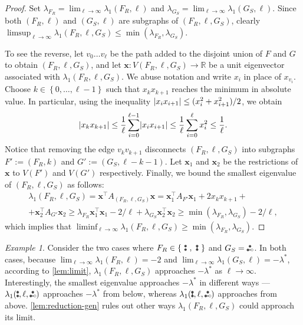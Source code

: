 \documentclass[11pt]{article}
\theoremstyle{definition}
\theoremstyle{remark}
\newtheorem*{example}{Example}
\DeclarePairedDelimiter\abs{\lvert}{\rvert}
\newcommand{\sset}[1]{\left\{{#1}\right\}}
\newcommand{\la}{\lambda}
\newcommand{\las}{\lambda^*}
\newcommand{\R}{\mathbb{R}}
\newcommand{\bx}{\bm{x}}
\newcommand{\T}{\intercal}
\newcommand{\etwo}{\tikz[baseline=-0.2ex, scale=0.9]{\draw[darkgray, thick] (0,0)--(0.2,0); \draw[darkgray, fill=darkgray] (0,0) circle (0.05); \draw[darkgray, fill=darkgray] (0.1,0.17320508075) circle (0.05); \draw[darkgray, fill=white] (0.2,0) circle (0.05);}}
\newcommand{\ktwo}{\tikz[baseline=-0.2ex, scale=0.9]{\draw[darkgray, thick] (0,0)--(0,0.17320508075); \draw[darkgray, fill=darkgray] (0,0) circle (0.05); \draw[darkgray, fill=darkgray] (0,0.17320508075) circle (0.05);}}
\newcommand{\ktwoc}{\tikz[baseline=-0.2ex, scale=0.9]{\draw[darkgray, fill=darkgray] (0,0) circle (0.05); \draw[darkgray, fill=darkgray] (0,0.17320508075) circle (0.05);}}
\begin{document}
\begin{proof}
    Set $\la_{F_R} = \lim_{\ell\to\infty} \la_1(F_R, \ell)$ and $\la_{G_S} = \lim_{\ell\to\infty} \la_1(G_S, \ell)$. Since both $(F_R, \ell)$ and $(G_S, \ell)$ are subgraphs of $(F_R, \ell, G_S)$, clearly $\limsup_{\ell \to\infty}\la_1(F_R, \ell, G_S) \le \min(\la_{F_R},\la_{G_S})$.
    
    To see the reverse, let $v_0\dots v_\ell$ be the path added to the disjoint union of $F$ and $G$ to obtain $(F_R, \ell, G_S)$, and let $\bx \colon V(F_R, \ell, G_S) \to \R$ be a unit eigenvector associated with $\la_1(F_R, \ell, G_S)$. We abuse notation and write $x_i$ in place of $x_{v_i}$. Choose $k \in \sset{0,\dots,\ell-1}$ such that $x_kx_{k+1}$ reaches the minimum in absolute value. In particular, using the inequality $\abs{x_ix_{i+1}} \le (x_i^2+x_{i+1}^2)/2$, we obtain
    \[
        \abs{x_kx_{k+1}} \le \frac{1}{\ell} \sum_{i=0}^{\ell-1}\abs{x_ix_{i+1}} \le \frac{1}{\ell}\sum_{i=0}^{\ell}x_i^2 \le \frac{1}{\ell}.
    \]
    Notice that removing the edge $v_kv_{k+1}$ disconnects $(F_R, \ell, G_S)$ into subgraphs $F' := (F_R, k)$ and $G' := (G_S, \ell-k-1)$. Let $\bx_1$ and $\bx_2$ be the restrictions of $\bx$ to $V(F')$ and $V(G')$ respectively. Finally, we bound the smallest eigenvalue of $(F_R, \ell, G_S)$ as follows:
    \begin{multline*}
        \la_1(F_R, \ell, G_S) = \bx^\T A_{(F_R, \ell, G_S)} \bx 
        = \bx_1^\T A_{F'} \bx_1 + 2x_kx_{k+1} + \\ + \bx_2^\T A_{G'}\bx_2
        \ge \la_{F_R} \bx_1^\T\bx_1 - 2/\ell + \la_{G_S}\bx_2^\T \bx_2
        \ge \min(\la_{F_R}, \la_{G_S}) - 2/\ell,
    \end{multline*}
    which implies that $\liminf_{\ell\to\infty} \la_1(F_R, \ell, G_S) \ge \min(\la_{F_R}, \la_{G_S})$.
\end{proof}

\begin{example}
    Consider the two cases where $F_R \in \sset{~\ktwoc~, ~\ktwo~}$ and $G_S = \etwo$. In both cases, because $\lim_{\ell \to \infty}\la_1(F_R,\ell) = -2$ and $\lim_{\ell \to \infty}\la_1(G_S,\ell) = -\las$, according to \cref{lem:limit}, $\la_1(F_R, \ell, G_S)$ approaches $-\las$ as $\ell \to \infty$. Interestingly, the smallest eigenvalue approaches $-\las$ in different ways --- $\la_1(\ktwoc, \ell, \etwo)$ approaches $-\las$ from below, whereas $\la_1(\ktwo, \ell, \etwo)$ approaches from above. \cref{lem:reduction-gen} rules out other ways $\la_1(F_R, \ell, G_S)$ could approach its limit.
\end{example}
\end{document}

